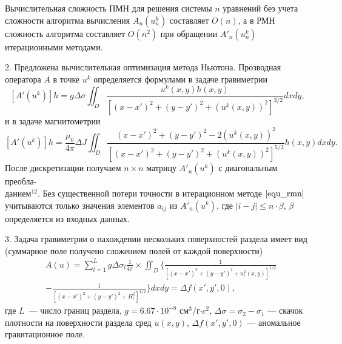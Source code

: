 \documentclass[%
autoref,     %
href,        %
colorlinks,  %
]{disser}
\begin{document}
Вычислительная сложность ПМН для решения системы $n$ уравнений без учета сложности алгоритма вычисления $A_n(u_n^k)$ составляет $O(n)$, а в РМН сложность алгоритма составляет $O(n^2)$ при обращении $A'_n(u_n^k)$ итерационными методами.

2. Предложена вычислительная оптимизация метода Ньютона. Прозводная оператора $A$ в точке $u^k$ определяется формулами в задаче гравиметрии
$$ [A'(u^k)]h=g\Delta\sigma\iint_{D} \frac{u^k(x,y)h(x,y)}{[(x-x')^2+(y-y')^2+(u^k(x,y))^2]^{3/2}}dxdy,$$
и в задаче магнитометрии
$$ [A'(u^k)]h=\frac{\mu_0}{4\pi}\Delta J\iint_{D} \frac{(x-x')^2+(y-y')^2-2(u^k(x,y))^2}{[(x-x')^2+(y-y')^2+(u^k(x,y))^2]^{5/2}}h(x,y) dxdy.$$
После дискретизации получаем $n\times n$ матрицу $A'_n(u^k)$ с диагональным преобла-\\данием$^{12}$. Без существенной потери точности в итерационном методе $\eqref{equ_rmn}$ учитываются только значения элементов $a_{ij}$ из $A'_n(u^k)$, где $|i-j|\leqslant n\cdot\beta$, $\beta$ определяется из входных данных.
{\scriptsize
	\let\thefootnote\relax\let\thefootnote\relax{}
	}

3. Задача гравиметрии о нахождении нескольких поверхностей раздела имеет вид (суммарное поле получено сложением полей от каждой поверхности)
\begin{equation}\label{equ_grav_multi}
		\begin{aligned}
		& A(u)=\sum_{l=1}^{L}g\Delta\sigma_l\frac{1}{4\pi}\times 
		\iint_D\bigg\{\frac{1}{[(x-x')^2+(y-y')^2+u_l^2(x,y)]^{1/2}} \\
		&-\frac{1}{[(x-x')^2+(y-y')^2+H_l^2]^{1/2}}\bigg\}dxdy=\Delta f(x',y',0),
		\end{aligned}
\end{equation}		
где $L$~--- число границ раздела, $g=6.67\cdot10^{-8}$ см$^3/$г$\cdot c^2$, $\Delta\sigma=\sigma_2-\sigma_1$ --- скачок плотности на поверхности раздела сред $u(x,y)$, $\Delta f(x',y',0)$ --- аномальное гравитационное поле.
\end{document}
